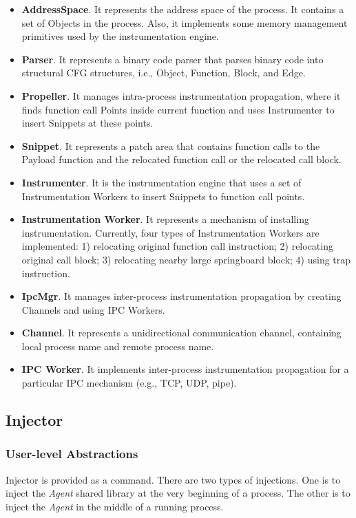 \begin{itemize}
\item \textbf{AddressSpace}. It represents the address space of the process. It
  contains a set of Objects in the process. Also, it implements some memory
  management primitives used by the instrumentation engine.
\item \textbf{Parser}. It represents a binary code parser that parses binary
  code into structural CFG structures, i.e., Object, Function, Block, and Edge.
\item \textbf{Propeller}. It manages intra-process instrumentation propagation,
  where it finds function call Points inside current function and uses
  Instrumenter to insert Snippets at these points.
\item \textbf{Snippet}. It represents a patch area that contains function calls
  to the Payload function and the relocated function call or the relocated call
  block.
\item \textbf{Instrumenter}. It is the instrumentation engine that uses a set of
  Instrumentation Workers to insert Snippets to function call points.
\item \textbf{Instrumentation Worker}. It represents a mechanism of installing
  instrumentation. Currently, four types of Instrumentation Workers are
  implemented: 1) relocating original function call instruction; 2) relocating
  original call block; 3) relocating nearby large springboard block; 4) using
  trap instruction.
\item \textbf{IpcMgr}. It manages inter-process instrumentation propagation by
  creating Channels and using IPC Workers.
\item \textbf{Channel}. It represents a unidirectional communication channel,
  containing local process name and remote process name.
\item \textbf{IPC Worker}. It implements inter-process instrumentation
  propagation for a particular IPC mechanism (e.g., TCP, UDP, pipe).
\end{itemize}

\subsection{Injector}
\subsubsection{User-level Abstractions}

Injector is provided as a command. 
There are two types of injections.
One is to inject the {\em Agent} shared library at the very beginning of a
process.
The other is to inject the {\em Agent} in the middle of a running process.

